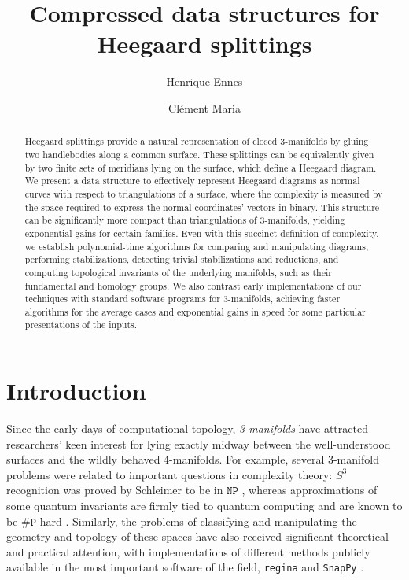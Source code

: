 \documentclass[11pt]{amsart}
\title[Compressed data structures for Heegaard splittings]{Compressed data structures for Heegaard splittings}
\author{Henrique Ennes}\thanks{INRIA d'Universit\'e C\^ote d'Azur, \texttt{henrique.lovisi-ennes@inria.fr}.}
\author{Cl\'ement Maria}\thanks{INRIA d'Universit\'e C\^ote d'Azur, \texttt{clement.maria@inria.fr}.}
\numberwithin{equation}{section}
\theoremstyle{plain}
\theoremstyle{definition}
\begin{document}
\begin{abstract}
Heegaard splittings provide a natural representation of closed 3-manifolds by gluing two handlebodies along a common surface. 
These splittings can be equivalently given by two finite sets of meridians lying on the surface, which define a Heegaard diagram.
We present a data structure to effectively represent Heegaard diagrams as normal curves with respect to triangulations of a surface, where the complexity is measured by the space required to express the normal coordinates' vectors in binary.
This structure can be significantly more compact than triangulations of 3-manifolds, yielding exponential gains for certain families.
Even with this succinct definition of complexity, we establish polynomial-time algorithms for comparing and manipulating diagrams, performing stabilizations, detecting trivial stabilizations and reductions, and computing topological invariants of the underlying manifolds, such as their fundamental and homology groups.
We also contrast early implementations of our techniques with standard software programs for 3-manifolds, achieving faster algorithms for the average cases and exponential gains in speed for some particular presentations of the inputs.
\end{abstract}


\maketitle

\section{Introduction}
Since the early days of computational topology, \emph{3-manifolds} have attracted researchers' keen interest \cite{haken1962homoomorphieproblem, jaco1984algorithm,lackenby2020algorithms3manifoldtheory} for lying exactly midway between the well-understood surfaces and the wildly behaved 4-manifolds.
For example, several 3-manifold problems were related to important questions in complexity theory: $S^3$ recognition was proved by Schleimer to be in $\texttt{NP}$ \cite{schleimer2011sphere}, whereas approximations of some quantum invariants are firmly tied to quantum computing and are known to be $\#\texttt{P}$-hard \cite{alagic2011quantum,alagic2014quantum}.
Similarly, the problems of classifying \cite{costantino2024learning, kuperberg2018identifying} and manipulating the geometry and topology of these spaces \cite{burton2013new, lackenby2024triangulation} have also received significant theoretical and practical attention, with implementations of different methods publicly available in the most important software of the field, \texttt{regina} \cite{regina} and \texttt{SnapPy} \cite{SnapPy}. 
\end{document}
